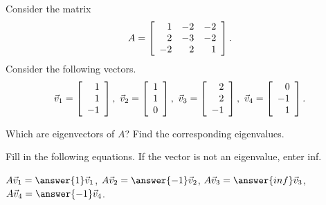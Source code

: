 \documentclass{ximera}
\author{Zack Reed}
\begin{document}
\begin{problem}
  Consider the matrix
  \begin{equation*}
    A = \startmat{rrr}
      1 & -2 & -2 \\
      2 & -3 & -2 \\
      -2 & 2 &  1 \\
    \stopmat.
  \end{equation*}
  Consider the following vectors. 
  \begin{equation*}
    \vect{v}_1 = \startmat{r} 1 \\ 1 \\ -1 \stopmat,\quad
    \vect{v}_2 = \startmat{r} 1 \\ 1 \\ 0 \stopmat,\quad
    \vect{v}_3 = \startmat{r} 2 \\ 2 \\ -1 \stopmat,\quad
    \vect{v}_4 = \startmat{r} 0 \\ -1 \\ 1 \stopmat.
  \end{equation*}

  Which are eigenvectors of $A$? Find the
  corresponding eigenvalues.

  \begin{selectAll}
  

  \end{selectAll}

  Fill in the following equations. If the vector is not an eigenvalue, enter inf.

  $A\vec{v}_1=\answer{1}\vec{v}_1$, $A\vec{v}_2=\answer{-1}\vec{v}_2$, $A\vec{v}_3=\answer{inf}\vec{v}_3$, $A\vec{v}_4=\answer{-1}\vec{v}_4$.

\end{problem}
\end{document}
